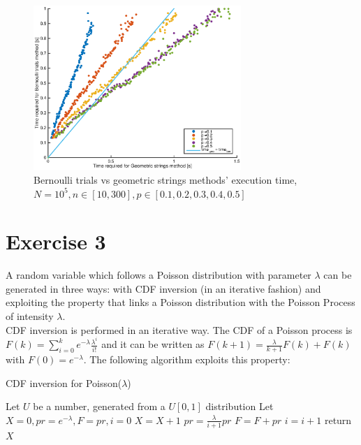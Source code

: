 \documentclass[10pt]{article}
\begin{document}
\begin{figure}[h]
  \centering
  \includegraphics[width = 0.7\textwidth]{images/geo_ber2}
  \caption{Bernoulli trials vs geometric strings methods' execution time, $N = 10^5, n\in [10, 300], p \in [0.1, 0.2, 0.3, 0.4, 0.5]$}
  \label{fig:geober}
\end{figure}



\section{Exercise 3}
A random variable which follows a Poisson distribution with parameter $\lambda$ can be generated in three ways: with CDF inversion (in an iterative fashion) and exploiting the property that links a Poisson distribution with the Poisson Process of intensity $\lambda$. \\
CDF inversion is performed in an iterative way. The CDF of a Poisson process is $F(k) = \sum_{i = 0}^k e^{-\lambda} \frac{\lambda ^i}{i!}$ and it can be written as $F(k+1) = \frac{\lambda}{k+1} F(k) + F(k)$ with $F(0) = e^{-\lambda}$. The following algorithm exploits this property:

\begin{algorithm}
  \caption{CDF inversion for Poisson($\lambda$)}\label{cdfinvpoi}
  \begin{algorithmic}[1]
    \Procedure{}{}
    \State Let $U$ be a number, generated from a $U[0,1]$ distribution
    \State Let $X = 0, pr = e^{-\lambda}, F = pr, i = 0$
    \State $X = X + 1$
    \State $pr = \frac{\lambda}{i+1}pr$
    \State $F = F + pr$
    \State $i = i + 1$
    \EndWhile
    \State return $X$
    \EndProcedure
  \end{algorithmic}
\end{algorithm}
\end{document}
